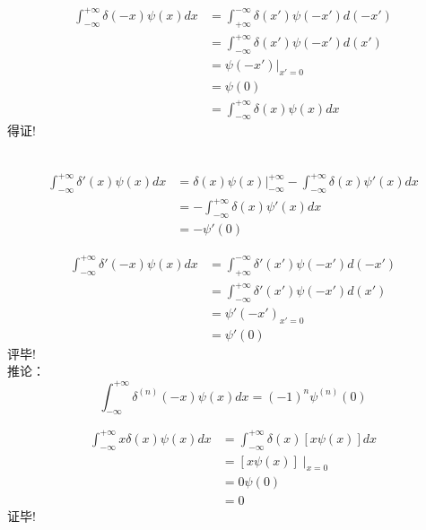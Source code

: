 	  {}
	  {}
	  {\证 ~}  \[
		\begin{aligned}
			\int_{-\infty}^{+\infty} \delta(-x) \psi (x) d x &= \int_{+\infty}^{-\infty} \delta(x') \psi (-x') d (-x') \\
			&= \int_{-\infty}^{+\infty} \delta(x') \psi (-x') d (x') \\
			&=  \psi (-x') | _{x'=0}\\
			&=  \psi (0) \\
			&=  \int_{-\infty}^{+\infty} \delta(x) \psi (x) d x 
		\end{aligned}
		   \]
		得证!



	{}
	{}
	{\证 }~  \[
	  \begin{aligned}
		\int_{-\infty}^{+\infty} \delta'(x) \psi (x) d x &= \delta(x) \psi (x)|_{-\infty}^{+\infty} - \int_{-\infty}^{+\infty} \delta(x) \psi' (x) d x \\
		  &=  - \int_{-\infty}^{+\infty} \delta(x) \psi' (x) d x \\
		  &=  - \psi' (0)
	  \end{aligned}
		 \]



	  {}
	  \[
		\begin{aligned}
		  \int_{-\infty}^{+\infty} \delta'(-x) \psi (x) d x &= \int_{+\infty}^{-\infty} \delta'(x') \psi (-x') d (-x') \\
			&= \int_{-\infty}^{+\infty} \delta'(x') \psi (-x') d (x') \\
			&=  \psi' (-x') _{x'=0}\\
			&=  \psi' (0) 
		\end{aligned}
		   \]
		评毕!\\ \vspace{1em}
		推论：\[ \int_{-\infty}^{+\infty} \delta^{(n)}(-x) \psi (x) d x = (-1)^n \psi^{(n)} (0)\]



	{}
	{\例 [3. 试证明 ]
	{\[ x\delta(x)  = 0\]}}
	{\证 }\[
		\begin{aligned}
		  \int_{-\infty}^{+\infty} x\delta(x) \psi (x) d x &= \int_{-\infty}^{+\infty} \delta(x) [x \psi (x)] d x \\
		    &=  [x \psi (x)] \mid_{x=0} \\
			&=  0\psi (0) \\
			&=  0
		\end{aligned}
		   \]
		证毕!



